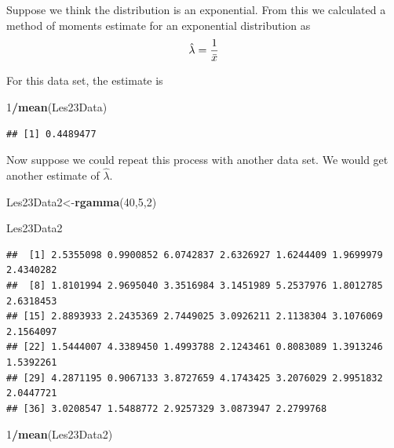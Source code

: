 \documentclass[]{book}
\newenvironment{Shaded}{\begin{snugshade}}{\end{snugshade}}
\newcommand{\KeywordTok}[1]{\textcolor[rgb]{0.13,0.29,0.53}{\textbf{#1}}}
\newcommand{\DecValTok}[1]{\textcolor[rgb]{0.00,0.00,0.81}{#1}}
\newcommand{\OperatorTok}[1]{\textcolor[rgb]{0.81,0.36,0.00}{\textbf{#1}}}
\newcommand{\NormalTok}[1]{#1}
\theoremstyle{definition}
\theoremstyle{definition}
\theoremstyle{definition}
\theoremstyle{remark}
\begin{document}
Suppose we think the distribution is an exponential. From this we
calculated a method of moments estimate for an exponential distribution
as \[\hat{\lambda}={1 \over \bar{x}}\]

For this data set, the estimate is

\begin{Shaded}
\begin{Highlighting}[]
\DecValTok{1}\OperatorTok{/}\KeywordTok{mean}\NormalTok{(Les23Data)}
\end{Highlighting}
\end{Shaded}

\begin{verbatim}
## [1] 0.4489477
\end{verbatim}

Now suppose we could repeat this process with another data set. We would
get another estimate of \(\hat{\lambda}\).

\begin{Shaded}
\begin{Highlighting}[]
\NormalTok{Les23Data2<-}\KeywordTok{rgamma}\NormalTok{(}\DecValTok{40}\NormalTok{,}\DecValTok{5}\NormalTok{,}\DecValTok{2}\NormalTok{)}
\end{Highlighting}
\end{Shaded}

\begin{Shaded}
\begin{Highlighting}[]
\NormalTok{Les23Data2}
\end{Highlighting}
\end{Shaded}

\begin{verbatim}
##  [1] 2.5355098 0.9900852 6.0742837 2.6326927 1.6244409 1.9699979 2.4340282
##  [8] 1.8101994 2.9695040 3.3516984 3.1451989 5.2537976 1.8012785 2.6318453
## [15] 2.8893933 2.2435369 2.7449025 3.0926211 2.1138304 3.1076069 2.1564097
## [22] 1.5444007 4.3389450 1.4993788 2.1243461 0.8083089 1.3913246 1.5392261
## [29] 4.2871195 0.9067133 3.8727659 4.1743425 3.2076029 2.9951832 2.0447721
## [36] 3.0208547 1.5488772 2.9257329 3.0873947 2.2799768
\end{verbatim}

\begin{Shaded}
\begin{Highlighting}[]
\DecValTok{1}\OperatorTok{/}\KeywordTok{mean}\NormalTok{(Les23Data2)}
\end{Highlighting}
\end{Shaded}
\end{document}

